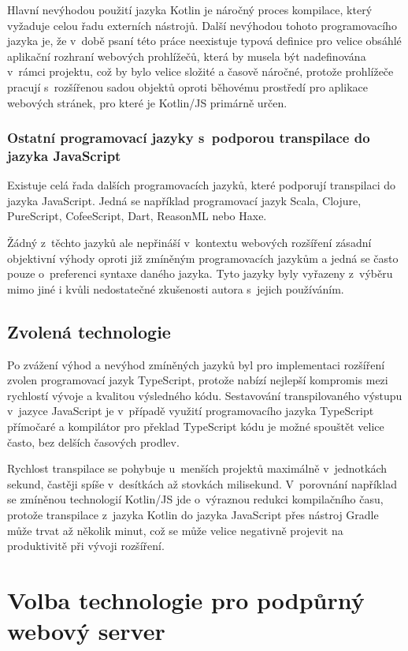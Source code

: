 Hlavní nevýhodou použití jazyka Kotlin je náročný proces kompilace, který vyžaduje celou řadu externích nástrojů. Další nevýhodou tohoto programovacího jazyka je, že v~době psaní této práce neexistuje typová definice pro velice obsáhlé aplikační rozhraní webových prohlížečů, která by musela být nadefinována v~rámci projektu, což by bylo velice složité a časově náročné, protože prohlížeče pracují s~rozšířenou sadou objektů oproti běhovému prostředí pro aplikace webových stránek, pro které je Kotlin/JS primárně určen.

\subsubsection{Ostatní programovací jazyky s~podporou transpilace do jazyka JavaScript}

Existuje celá řada dalších programovacích jazyků, které podporují transpilaci do jazyka JavaScript. Jedná se například programovací jazyk Scala, Clojure, PureScript, CofeeScript, Dart, ReasonML nebo Haxe.

Žádný z~těchto jazyků ale nepřináší v~kontextu webových rozšíření zásadní objektivní výhody oproti již zmíněným programovacích jazykům a jedná se často pouze o~preferenci syntaxe daného jazyka. Tyto jazyky byly vyřazeny z~výběru mimo jiné i kvůli nedostatečné zkušenosti autora s~jejich používáním.  

\subsection{Zvolená technologie}

Po zvážení výhod a nevýhod zmíněných jazyků byl pro implementaci rozšíření zvolen programovací jazyk TypeScript, protože nabízí nejlepší kompromis mezi rychlostí vývoje a kvalitou výsledného kódu. Sestavování transpilovaného výstupu v~jazyce JavaScript je v~případě využití programovacího jazyka TypeScript přímočaré a kompilátor pro překlad TypeScript kódu je možné spouštět velice často, bez delších časových prodlev. 

Rychlost transpilace se pohybuje u~menších projektů maximálně v~jednotkách sekund, častěji spíše v~desítkách až stovkách milisekund. V~porovnání například se zmíněnou technologií Kotlin/JS jde o~výraznou redukci kompilačního času, protože transpilace z~jazyka Kotlin do jazyka JavaScript přes nástroj Gradle může trvat až několik minut, což se může velice negativně projevit na produktivitě při vývoji rozšíření.

\section{Volba technologie pro podpůrný webový server}

